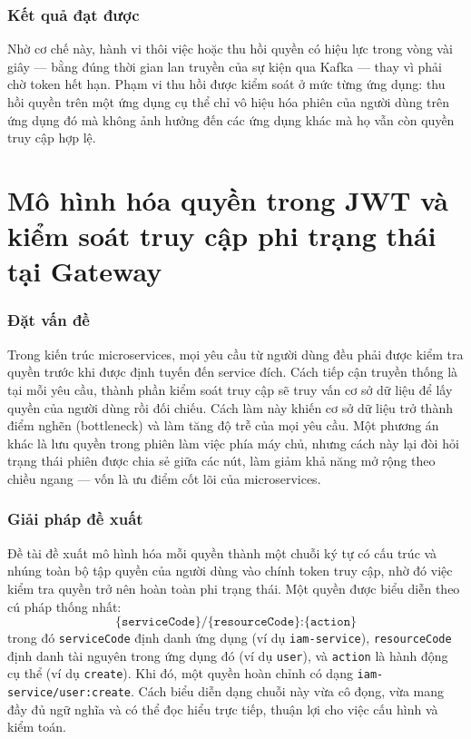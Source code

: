 \documentclass[../DoAn.tex]{subfiles}
\begin{document}
\subsubsection*{Kết quả đạt được}

Nhờ cơ chế này, hành vi thôi việc hoặc thu hồi quyền có hiệu lực trong vòng vài giây --- bằng đúng thời gian lan truyền của sự kiện qua Kafka --- thay vì phải chờ token hết hạn. Phạm vi thu hồi được kiểm soát ở mức từng ứng dụng: thu hồi quyền trên một ứng dụng cụ thể chỉ vô hiệu hóa phiên của người dùng trên ứng dụng đó mà không ảnh hưởng đến các ứng dụng khác mà họ vẫn còn quyền truy cập hợp lệ.

\section{Mô hình hóa quyền trong JWT và kiểm soát truy cập phi trạng thái tại Gateway}
\label{section:5.3}

\subsubsection*{Đặt vấn đề}

Trong kiến trúc microservices, mọi yêu cầu từ người dùng đều phải được kiểm tra quyền trước khi được định tuyến đến service đích. Cách tiếp cận truyền thống là tại mỗi yêu cầu, thành phần kiểm soát truy cập sẽ truy vấn cơ sở dữ liệu để lấy quyền của người dùng rồi đối chiếu. Cách làm này khiến cơ sở dữ liệu trở thành điểm nghẽn (bottleneck) và làm tăng độ trễ của mọi yêu cầu. Một phương án khác là lưu quyền trong phiên làm việc phía máy chủ, nhưng cách này lại đòi hỏi trạng thái phiên được chia sẻ giữa các nút, làm giảm khả năng mở rộng theo chiều ngang --- vốn là ưu điểm cốt lõi của microservices.

\subsubsection*{Giải pháp đề xuất}

Đề tài đề xuất mô hình hóa mỗi quyền thành một chuỗi ký tự có cấu trúc và nhúng toàn bộ tập quyền của người dùng vào chính token truy cập, nhờ đó việc kiểm tra quyền trở nên hoàn toàn phi trạng thái. Một quyền được biểu diễn theo cú pháp thống nhất:
\[
\texttt{\{serviceCode\}/\{resourceCode\}:\{action\}}
\]
trong đó \texttt{serviceCode} định danh ứng dụng (ví dụ \texttt{iam-service}), \texttt{resourceCode} định danh tài nguyên trong ứng dụng đó (ví dụ \texttt{user}), và \texttt{action} là hành động cụ thể (ví dụ \texttt{create}). Khi đó, một quyền hoàn chỉnh có dạng \texttt{iam-service/user:create}. Cách biểu diễn dạng chuỗi này vừa cô đọng, vừa mang đầy đủ ngữ nghĩa và có thể đọc hiểu trực tiếp, thuận lợi cho việc cấu hình và kiểm toán.
\end{document}
